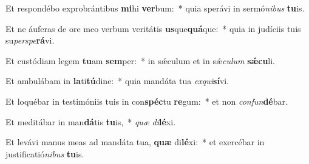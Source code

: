 \item Et respondébo exprobrántibus \textbf{mi}hi \textbf{ver}bum:~* quia sperávi in sermó\textit{ni}\textit{bus} \textbf{tu}is.
\item Et ne áuferas de ore meo verbum veritátis \textbf{us}que\textbf{quá}que:~* quia in judíciis tuis su\textit{per}\textit{spe}\textbf{rá}vi.
\item Et custódiam legem \textbf{tu}am \textbf{sem}per:~* in sǽculum et in sǽ\textit{cu}\textit{lum} \textbf{sǽ}\textbf{cu}li.
\item Et ambulábam in \textbf{la}ti\textbf{tú}dine:~* quia mandáta tua \textit{ex}\textit{qui}\textbf{sí}vi.
\item Et loquébar in testimóniis tuis in con\textbf{spéc}tu \textbf{re}gum:~* et non \textit{con}\textit{fun}\textbf{dé}bar.
\item Et meditábar in man\textbf{dá}tis \textbf{tu}is,~* \textit{quæ} \textit{di}\textbf{lé}xi.
\item Et levávi manus meas ad mandáta tua, \textbf{quæ} di\textbf{lé}xi:~* et exercébar in justificatió\textit{ni}\textit{bus} \textbf{tu}is.
